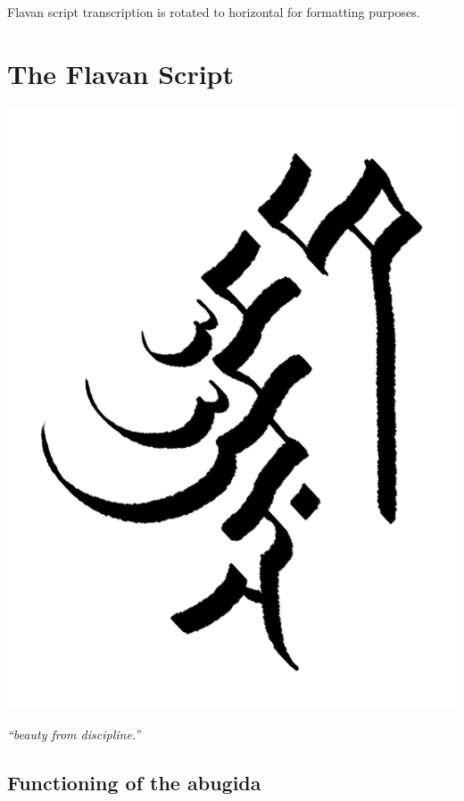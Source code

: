 \documentclass[10pt,oneside]{memoir}
\begin{document}
Flavan script transcription is rotated to horizontal for formatting purposes.

\begin{multicols}{2}

\end{multicols}


\chapter{The Flavan Script}\label{script}

\begin{center}
    \hspace{-60pt} \includegraphics[scale=2.1]{scriptchapter.png}

    \emph{``beauty from discipline.''}
\end{center}

\pagebreak

\section{Functioning of the abugida}
\end{document}
